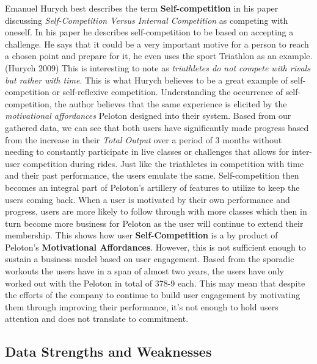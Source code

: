 \documentclass[
]{article}
\begin{document}
Emanuel Hurych best describes the term \textbf{Self-competition} in his paper discussing \emph{Self-Competition Versus Internal Competition} as competing with oneself. In his paper he describes self-competition to be based on accepting a challenge. He says that it could be a very important motive for a person to reach a chosen point and prepare for it, he even uses the sport Triathlon as an example.(Hurych 2009) This is interesting to note as \emph{triathletes do not compete with rivals but rather with time}. This is what Hurych believes to be a great example of self-competition or self-reflexive competition. Understanding the occurrence of self-competition, the author believes that the same experience is elicited by the \emph{motivational affordances} Peloton designed into their system. Based from our gathered data, we can see that both users have significantly made progress based from the increase in their \emph{Total Output} over a period of 3 months without needing to constantly participate in live classes or challenges that allows for inter-user competition during rides. Just like the triathletes in competition with time and their past performance, the users emulate the same. Self-competition then becomes an integral part of Peloton's artillery of features to utilize to keep the users coming back. When a user is motivated by their own performance and progress, users are more likely to follow through with more classes which then in turn become more business for Peloton as the user will continue to extend their membership. This shows how user \textbf{Self-Competition} is a by product of Peloton's \textbf{Motivational Affordances}. However, this is not sufficient enough to sustain a business model based on user engagement. Based from the sporadic workouts the users have in a span of almost two years, the users have only worked out with the Peloton in total of 378-9 each. This may mean that despite the efforts of the company to continue to build user engagement by motivating them through improving their performance, it's not enough to hold users attention and does not translate to commitment.

\hypertarget{data-strengths-and-weaknesses}{%
\subsection{Data Strengths and Weaknesses}\label{data-strengths-and-weaknesses}}
\end{document}
